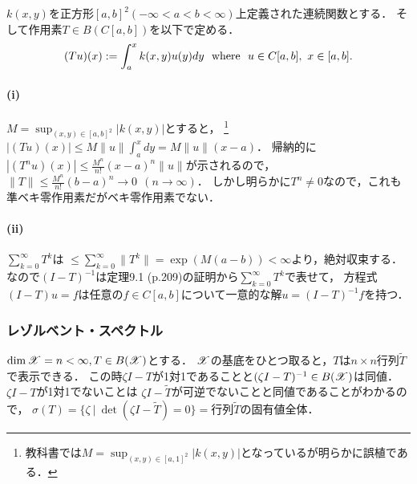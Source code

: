         \begin{Example}[問題9.2, p.223]
            $k(x,y)$を正方形$[a,b]^2 (-\infty<a<b<\infty)$上定義された連続関数とする．
            そして作用素$T \in B(C[a,b])$を以下で定める．
            \[ (Tu)(x):=\int_a^x k(x,y)u(y) dy \text{~~where~~} u \in C[a,b],~ x \in [a,b]. \]

            \paragraph{(i)}
            $M=\sup_{(x,y) \in [a,b]^2}|k(x,y)|$とすると，
            \footnote{教科書では$M=\sup_{(x,y) \in [a,1]^2}|k(x,y)|$となっているが明らかに誤植である．}
            $|(T u)(x)| \leq M \|u\| \int_a^x dy=M \|u\| (x-a)$．
            帰納的に$|(T^n u)(x)| \leq \frac{M^n}{n!} (x-a)^n \|u\|$が示されるので，
            $\|T\| \leq \frac{M^n}{n!} (b-a)^n \to 0 ~~(n \to \infty)$．
            しかし明らかに$T^n \neq 0$なので，これも準ベキ零作用素だがベキ零作用素でない．
            
            \paragraph{(ii)}
            $\sum_{k=0}^{\infty}T^k$は
            $\leq \sum_{k=0}^{\infty} \|T^k\|=\exp(M(a-b))<\infty$より，絶対収束する．
            なので$(I-T)^{-1}$は定理9.1 (p.209)の証明から$\sum_{k=0}^{\infty}T^k$で表せて，
            方程式$(I-T)u=f$は任意の$f \in C[a,b]$について一意的な解$u=(I-T)^{-1}f$を持つ．
        \end{Example}

        \subsubsection{レゾルベント・スペクトル}
        \begin{Example}[例9.15, p.217]
            $\dim \mathscr{X}=n < \infty,T \in B(\mathscr{X})$とする．
            $\mathscr{X}$の基底をひとつ取ると，$T$は$n \times n$行列$\tilde{T}$で表示できる．
            この時$\zeta I-T$が1対1であることと$(\zeta I-T)^{-1} \in B(\mathscr{X})$は同値．
            $\zeta I-T$が1対1でないことは
            $\zeta I-\tilde{T}$が可逆でないことと同値であることがわかるので，
            $\sigma(T)=\{\zeta ~|~ \det(\zeta I-\tilde{T})=0 \}=\text{行列$\tilde{T}$の固有値全体．}$
        \end{Example}

